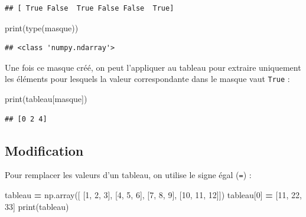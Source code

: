 \documentclass[12pt,]{book}
\newenvironment{Shaded}{\begin{snugshade}}{\end{snugshade}}
\newcommand{\DecValTok}[1]{\textcolor[rgb]{0.00,0.00,0.81}{#1}}
\newcommand{\OperatorTok}[1]{\textcolor[rgb]{0.81,0.36,0.00}{\textbf{#1}}}
\newcommand{\BuiltInTok}[1]{#1}
\newcommand{\NormalTok}[1]{#1}
\numberwithin{equation}{section}
\numberwithin{countremarque}{section}
\begin{document}
\begin{lstlisting}
## [ True False  True False False  True]
\end{lstlisting}

\begin{Shaded}
\begin{Highlighting}[]
\BuiltInTok{print}\NormalTok{(}\BuiltInTok{type}\NormalTok{(masque))}
\end{Highlighting}
\end{Shaded}

\begin{lstlisting}
## <class 'numpy.ndarray'>
\end{lstlisting}

Une fois ce masque créé, on peut l'appliquer au tableau pour extraire
uniquement les éléments pour lesquels la valeur correspondante dans le
masque vaut \texttt{True} :

\begin{Shaded}
\begin{Highlighting}[]
\BuiltInTok{print}\NormalTok{(tableau[masque])}
\end{Highlighting}
\end{Shaded}

\begin{lstlisting}
## [0 2 4]
\end{lstlisting}

\subsection{Modification}\label{modification-3}

Pour remplacer les valeurs d'un tableau, on utilise le signe égal
(\texttt{=}) :

\begin{Shaded}
\begin{Highlighting}[]
\NormalTok{tableau }\OperatorTok{=}\NormalTok{ np.array([ [}\DecValTok{1}\NormalTok{, }\DecValTok{2}\NormalTok{, }\DecValTok{3}\NormalTok{], [}\DecValTok{4}\NormalTok{, }\DecValTok{5}\NormalTok{, }\DecValTok{6}\NormalTok{], [}\DecValTok{7}\NormalTok{, }\DecValTok{8}\NormalTok{, }\DecValTok{9}\NormalTok{], [}\DecValTok{10}\NormalTok{, }\DecValTok{11}\NormalTok{, }\DecValTok{12}\NormalTok{]])}
\NormalTok{tableau[}\DecValTok{0}\NormalTok{] }\OperatorTok{=}\NormalTok{ [}\DecValTok{11}\NormalTok{, }\DecValTok{22}\NormalTok{, }\DecValTok{33}\NormalTok{]}
\BuiltInTok{print}\NormalTok{(tableau)}
\end{Highlighting}
\end{Shaded}
\end{document}
